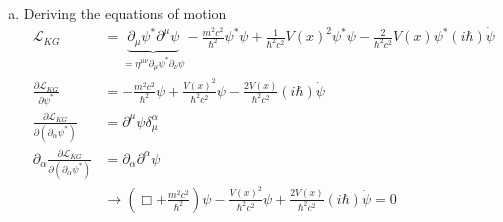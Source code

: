 \documentclass[../main.tex]{subfiles}
\begin{document}
\begin{enumerate}[(a)]
\item Deriving the equations of motion 
\begin{align}
\mathcal{L}_{KG}&=\underbrace{\partial_\mu\psi^*\partial^\mu\psi}_{=\eta^{\mu\nu}\partial_\mu\psi^*\partial_\nu\psi}-\frac{m^2c^2}{\hbar^2}\psi^*\psi+\frac{1}{\hbar^2c^2}V(x)^2\psi^*\psi-\frac{2}{\hbar^2c^2}V(x)\psi^*(i\hbar)\dot{\psi}\\
\frac{\partial\mathcal{L}_{KG}}{\partial\psi^*}
&=-\frac{m^2c^2}{\hbar^2}\psi
+\frac{V(x)^2}{\hbar^2c^2}\psi
-\frac{2V(x)}{\hbar^2c^2}(i\hbar)\dot{\psi}\\
\frac{\partial\mathcal{L}_{KG}}{\partial(\partial_\alpha\psi^*)}
&=\partial^\mu\psi\delta^\alpha_\mu\\
\partial_\alpha\frac{\partial\mathcal{L}_{KG}}{\partial(\partial_\alpha\psi^*)}
&=\partial_\alpha\partial^\alpha\psi\\
&\rightarrow\left(\Box+\frac{m^2c^2}{\hbar^2}\right)\psi-\frac{V(x)^2}{\hbar^2c^2}\psi+\frac{2V(x)}{\hbar^2c^2}(i\hbar)\dot{\psi}=0
\end{align}


\end{enumerate}
\end{document}

